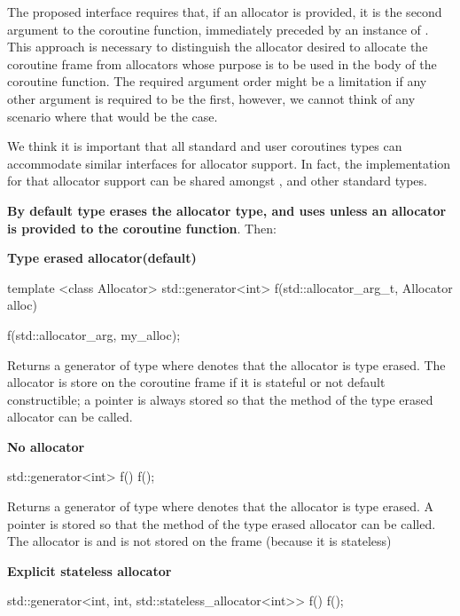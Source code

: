 \documentclass{wg21}
\begin{document}
The proposed interface requires that, if an allocator is provided, it is the second argument to the coroutine function, 
immediately preceded by an instance of .
This approach is necessary to distinguish the allocator desired to allocate the coroutine frame from allocators whose purpose is to be used in the body of the coroutine function.
The required argument order might be a limitation if any other argument is required to be the first, however, we cannot think of any scenario where that would be the case.

We think it is important that all standard and user coroutines types can accommodate similar interfaces for allocator support.
In fact, the implementation for that allocator support can be shared amongst ,  and other standard types.


\textbf{By default  type erases the allocator type, and uses  unless an allocator is provided to
the coroutine function}.
Then:

\textbf{Type erased allocator(default)}

\begin{colorblock}
template <class Allocator>
std::generator<int> f(std::allocator_arg_t, Allocator alloc) {}

f(std::allocator_arg, my_alloc{});
\end{colorblock}

Returns a generator of type  where  denotes that the allocator is type erased.
The allocator is store on the coroutine frame if it is stateful or not default constructible; a pointer is always stored so that the  method of the type erased allocator can be called.


\textbf{No allocator}

\begin{colorblock}
std::generator<int> f() {}
f();
\end{colorblock}

Returns a generator of type  where  denotes that the allocator is type erased.
A pointer is stored so that the  method of the type erased allocator can be called. The allocator is  and is not stored on the frame (because it is stateless)

\textbf{Explicit stateless allocator}

\begin{colorblock}
std::generator<int, int, std::stateless_allocator<int>> f() {}
f();
\end{colorblock}
\end{document}
